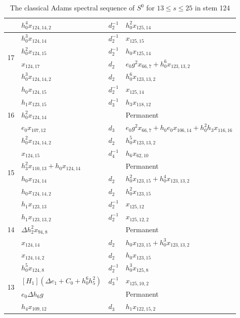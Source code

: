 \begin{table}[htbp]
{\begin{tabular}{|c|l|l|l|}
 & $h_0^4x_{124,14,2}$ & $d_{2}^{-1}$ & $h_0^2x_{125,14}$ \\\hline\hline
\multirow{4}{*}{17} & $h_0^3x_{124,14}$ & $d_{2}^{-1}$ & $x_{125,15}$ \\\cline{2-4}
 & $h_0^2x_{124,15}$ & $d_{2}^{-1}$ & $h_0x_{125,14}$ \\\cline{2-4}
 & $x_{124,17}$ & $d_{2}$ & $e_0g^2x_{66,7}+h_0^6x_{123,13,2}$ \\\cline{2-4}
 & $h_0^3x_{124,14,2}$ & $d_{2}$ & $h_0^6x_{123,13,2}$ \\\hline\hline
\multirow{5}{*}{16} & $h_0x_{124,15}$ & $d_{2}^{-1}$ & $x_{125,14}$ \\\cline{2-4}
 & $h_1x_{123,15}$ & $d_{3}^{-1}$ & $h_3x_{118,12}$ \\\cline{2-4}
 & $h_0^2x_{124,14}$ & & Permanent \\\cline{2-4}
 & $e_0x_{107,12}$ & $d_{3}$ & $e_0g^2x_{66,7}+h_0e_0x_{106,14}+h_0^2h_3x_{116,16}$ \\\cline{2-4}
 & $h_0^2x_{124,14,2}$ & $d_{2}$ & $h_0^5x_{123,13,2}$ \\\hline\hline
\multirow{4}{*}{15} & $x_{124,15}$ & $d_{4}^{-1}$ & $h_6x_{62,10}$ \\\cline{2-4}
 & $h_3^2x_{110,13}+h_0x_{124,14}$ & & Permanent \\\cline{2-4}
 & $h_0x_{124,14}$ & $d_{2}$ & $h_0^2x_{123,15}+h_0^4x_{123,13,2}$ \\\cline{2-4}
 & $h_0x_{124,14,2}$ & $d_{2}$ & $h_0^2x_{123,15}$ \\\hline\hline
\multirow{5}{*}{14} & $h_1x_{123,13}$ & $d_{2}^{-1}$ & $x_{125,12}$ \\\cline{2-4}
 & $h_1x_{123,13,2}$ & $d_{2}^{-1}$ & $x_{125,12,2}$ \\\cline{2-4}
 & $\Delta h_2^2x_{94,8}$ & & Permanent \\\cline{2-4}
 & $x_{124,14}$ & $d_{2}$ & $h_0x_{123,15}+h_0^3x_{123,13,2}$ \\\cline{2-4}
 & $x_{124,14,2}$ & $d_{2}$ & $h_0x_{123,15}$ \\\hline\hline
\multirow{4}{*}{13} & $h_0^5x_{124,8}$ & $d_{2}^{-1}$ & $h_0^3x_{125,8}$ \\\cline{2-4}
 & $[H_1](\Delta e_1+C_0+h_0^6h_5^2)$ & $d_{3}^{-1}$ & $x_{125,10,2}$ \\\cline{2-4}
 & $e_0\Delta h_6g$ & & Permanent \\\cline{2-4}
 & $h_4x_{109,12}$ & $d_{3}$ & $h_1x_{122,15,2}$ \\\hline
\end{tabular}}
\caption{The classical Adams spectral sequence of $S^0$ for $13 \le s \le 25$ in stem 124}
\label{Table:S124.13}
\end{table}

